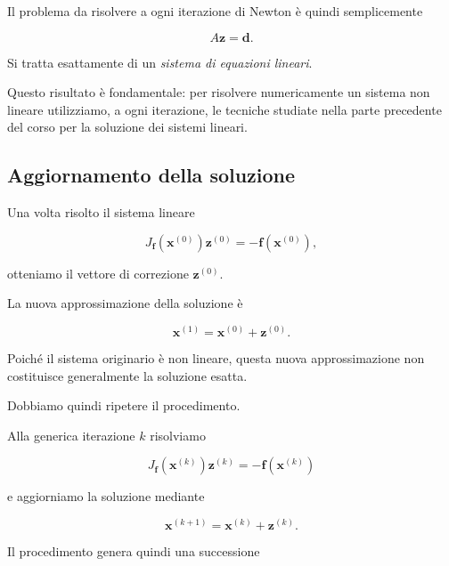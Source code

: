 Il problema da risolvere a ogni iterazione di Newton è quindi
semplicemente

\begin{equation*}
    A\mathbf{z}=\mathbf{d}.
\end{equation*}

Si tratta esattamente di un \emph{sistema di equazioni lineari}.

Questo risultato è fondamentale: per risolvere numericamente un
sistema non lineare utilizziamo, a ogni iterazione, le tecniche
studiate nella parte precedente del corso per la soluzione dei
sistemi lineari.


\subsection{Aggiornamento della soluzione}

Una volta risolto il sistema lineare

\begin{equation*}
    J_{\mathbf{f}}(\mathbf{x}^{(0)})
    \mathbf{z}^{(0)}
    =
    -\mathbf{f}(\mathbf{x}^{(0)}),
\end{equation*}

otteniamo il vettore di correzione $\mathbf{z}^{(0)}$.

La nuova approssimazione della soluzione è

\begin{equation*}
    \mathbf{x}^{(1)}
    =
    \mathbf{x}^{(0)}
    +
    \mathbf{z}^{(0)}.
\end{equation*}

Poiché il sistema originario è non lineare, questa nuova
approssimazione non costituisce generalmente la soluzione esatta.

Dobbiamo quindi ripetere il procedimento.

Alla generica iterazione $k$ risolviamo

\begin{equation*}
J_{\mathbf{f}}(\mathbf{x}^{(k)})
\mathbf{z}^{(k)}
=
-\mathbf{f}(\mathbf{x}^{(k)})
\label{eq:newton-system-iteration}
\end{equation*}

e aggiorniamo la soluzione mediante

\begin{equation*}
\mathbf{x}^{(k+1)}
=
\mathbf{x}^{(k)}
+
\mathbf{z}^{(k)}.
\label{eq:newton-system-update}
\end{equation*}

Il procedimento genera quindi una successione

